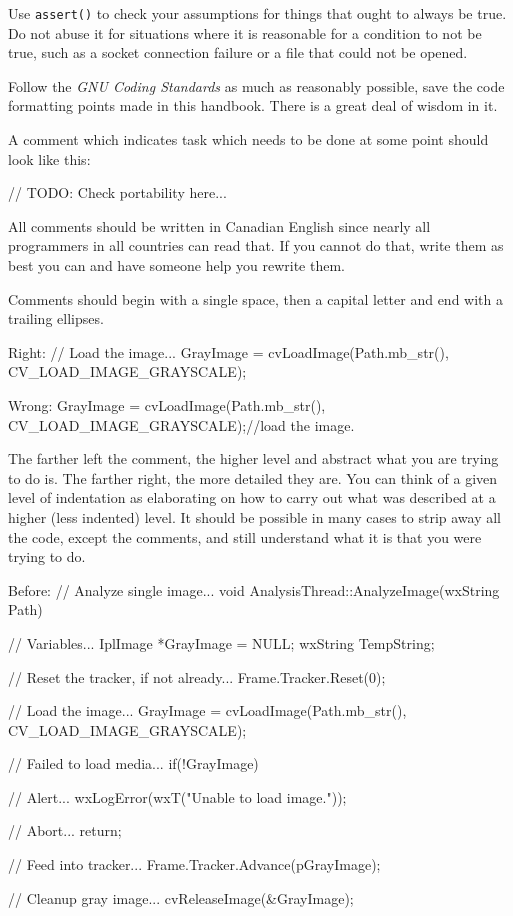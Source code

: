 \item
Use {\tt assert()} to check your assumptions for things that ought to always be true. Do not abuse it for situations where it is reasonable for a condition to not be true, such as a socket connection failure or a file that could not be opened.

\item
Follow the {\it GNU Coding Standards} as much as reasonably possible, save the code formatting points made in this handbook. There is a great deal of wisdom in it.

\item
A comment which indicates task which needs to be done at some point should look like this: 

\startCodeExample
// TODO: Check portability here...
\stopCodeExample

\stopitemize


\startitemize[4]
\item
All comments should be written in Canadian English since nearly all programmers in all countries can read that. If you cannot do that, write them as best you can and have someone help you rewrite them.

\item
Comments should begin with a single space, then a capital letter and end with a trailing ellipses. 

Right:
\startCodeExample
// Load the image...
GrayImage = cvLoadImage(Path.mb_str(), CV_LOAD_IMAGE_GRAYSCALE);
\stopCodeExample

Wrong:
\startCodeExample
GrayImage = cvLoadImage(Path.mb_str(), CV_LOAD_IMAGE_GRAYSCALE);//load the image.
\stopCodeExample

\item
The farther left the comment, the higher level and abstract what you are trying to do is. The farther right, the more detailed they are. You can think of a given level of indentation as elaborating on how to carry out what was described at a higher (less indented) level. It should be possible in many cases to strip away all the code, except the comments, and still understand what it is that you were trying to do.

Before:
\startCodeExample
// Analyze single image...
void AnalysisThread::AnalyzeImage(wxString Path)
{
    // Variables...
    IplImage   *GrayImage   = NULL;
    wxString    TempString;

    // Reset the tracker, if not already...
    Frame.Tracker.Reset(0);

    // Load the image...
    GrayImage = cvLoadImage(Path.mb_str(), CV_LOAD_IMAGE_GRAYSCALE);

        // Failed to load media...
        if(!GrayImage)
        {
            // Alert...
            wxLogError(wxT("Unable to load image."));
            
            // Abort...
            return;
        }

    // Feed into tracker...
    Frame.Tracker.Advance(pGrayImage);
    
    // Cleanup gray image...
    cvReleaseImage(&GrayImage);
}
\stopCodeExample


